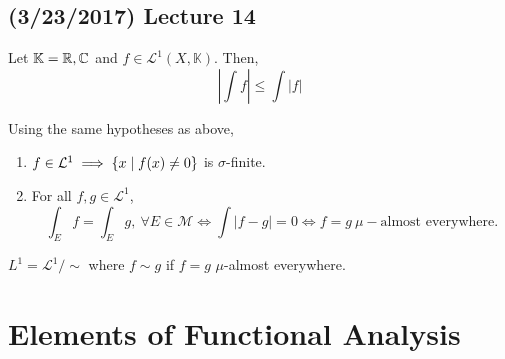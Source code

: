 \documentclass[11pt,leqno,oneside]{amsbook}
\numberwithin{thm}{section}
\newcommand{\M}{\mathcal{M}} %
\newcommand{\cL}{\mathcal{L}}
\begin{document}
\subsection*{(3/23/2017) Lecture 14}
\begin{prop}
  Let \(\mathbb{K} = {\mathbb R},{\mathbb C}\) and \(f \in
  \cL^1(X,\mathbb{K})\). Then, \[
    \left| \int f \right| \leq \int \left| f \right|
  \]
\end{prop}
\begin{prop}
  Using the same hypotheses as above,
  \begin{enumerate}
  \item \(f \in \cL^1 \implies \{x \st f(x) \neq 0\}\) is
    \(\sigma\)-finite.
  \item For all \(f,g \in \cL^1\), \[
      \int_E f = \int_E g, \ \forall E \in \M \iff \int |f-g| = 0 \iff
      f=g \ \mu-\text{almost everywhere}.
    \]
  \end{enumerate}

\end{prop}
\begin{defn}
  \(L^1 = \cL^1/\sim\) where \(f \sim g\) if \(f=g\) \(\mu\)-almost everywhere.
\end{defn}
\section{Elements of Functional Analysis}
\end{document}
